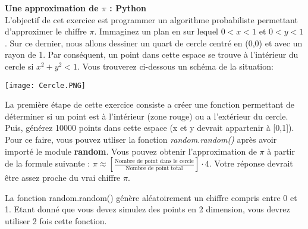 \begin{Exercice}[20 minutes]\textbf{Une approximation de $\pi$ : Python}\\
L'objectif de cet exercice est programmer un algorithme probabiliste permettant d'approximer le chiffre $\pi$. Immaginez un plan en sur lequel $0 < x < 1$ et $0 < y < 1$. Sur ce dernier, nous allons dessiner un quart de cercle centré en (0,0) et avec un rayon de 1. Par conséquent, un point dans cette espace se trouve à l'intérieur du cercle si $x^2 + y^2 < 1$. Vous trouverez ci-dessous un schéma de la situation:
\begin{center}
\texttt{[image: Cercle.PNG]}
\end{center}
La première étape de cette exercice consiste a créer une fonction permettant de déterminer si un point est à l'intérieur (zone rouge) ou a l'extérieur du cercle. Puis, générez 10000 points dans cette espace (x et y devrait appartenir à [0,1]). Pour ce faire, vous pouvez utliser la fonction \textit{random.random()} après avoir importé le module \textbf{random}. Vous pouvez obtenir l'approximation de $\pi$ à partir de la formule suivante : $\pi \approx [\frac{\text{Nombre de point dans le cercle}}{\text{Nombre de point total}}]\cdot 4$. Votre réponse devrait être assez proche du vrai chiffre $\pi$.\\
\begin{conseil}
    La fonction random.random() génère aléatoirement un chiffre compris entre 0 et 1. Etant donné que vous devez simulez des points en 2 dimension, vous devrez utiliser 2 fois cette fonction.
\end{conseil}
\begin{solution}
 
\end{solution}

\end{Exercice}

